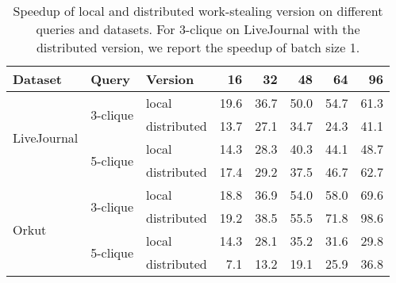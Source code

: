 \begin{table}
    \centering
\begin{tabular}{lllrrrrr}
\toprule
Dataset & Query & Version & 16 & 32 & 48 & 64 & 96 \\\midrule
\multirow{4}{*}{LiveJournal}  & \multirow{2}{*}{3-clique} & local & 19.6  & 36.7 & 50.0 & 54.7 & 61.3 \\
& & distributed & 13.7 & 27.1 & 34.7 & 24.3 & 41.1 \\
\cline{2-8}
& \multirow{2}{*}{5-clique} & local & 14.3 & 28.3 & 40.3 & 44.1 & 48.7 \\
& &  distributed &  17.4 & 29.2& 37.5 & 46.7 & 62.7\\\hline
\multirow{4}{*}{Orkut}  & \multirow{2}{*}{3-clique} & local & 18.8  & 36.9 & 54.0 & 58.0 & 69.6 \\
& & distributed & 19.2 & 38.5 & 55.5 & 71.8 & 98.6 \\
\cline{2-8}
& \multirow{2}{*}{5-clique} & local & 14.3 & 28.1 & 35.2 & 31.6 &  29.8 \\
& &  distributed & 7.1 & 13.2 & 19.1 & 25.9 & 36.8\\
    \bottomrule
\end{tabular}
    \caption{Speedup of local and distributed work-stealing version on different queries and datasets.
      For 3-clique on LiveJournal with the distributed version, we report the speedup of batch size 1.
    }
    \label{table:local-vs-distributed}
\end{table}




